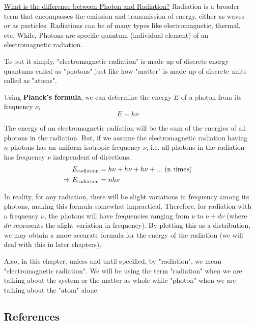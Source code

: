 \documentclass[12pt]{article}
\begin{document}
\uline{What is the difference between Photon and Radiation?} Radiation is a broader term that encompasses the emission and transmission of energy, either as waves or as particles. Radiations can be of many types like electromagnetic, thermal, etc. While, Photons are specific quantum (individual element) of an electromagnetic radiation. \vspace{.2cm}

To put it simply, "electromagnetic radiation" is made up of discrete energy quantums called as "photons" just like how "matter" is made up of discrete units called as "atoms". \vspace{.2cm}

Using \textbf{Planck's formula}, we can determine the energy \(E\) of a photon from its frequency \(\nu\), \vspace{.2cm}
\begin{equation}
    E = h\nu
\end{equation} \vspace{.2cm}

The energy of an electromagnetic radiation will be the sum of the energies of all photons in the radiation. But, if we assume the electromagnetic radiation having $n$ photons has an uniform isotropic frequency $\nu$, i.e. all photons in the radiation has frequency $\nu$ independent of directions,
\begin{align}
    E_{\text{radiation}} &= h\nu + h\nu + h\nu + ... \text{ (n times)} \notag \\
    \Rightarrow E_{\text{radiation}} &= nh\nu
\end{align}

In reality, for any radiation, there will be slight variations in frequency among its photons, making this formula somewhat impractical. Therefore, for radiation with a frequency \(\nu\), the photons will have frequencies ranging from \(\nu\) to \(\nu + d\nu\) (where \(d\nu\) represents the slight variation in frequency). By plotting this as a distribution, we may obtain a more accurate formula for the energy of the radiation (we will deal with this in later chapters). \vspace{.2cm}

Also, in this chapter, unless and until specified, by "radiation", we mean "electromagnetic radiation". We will be using the term "radiation" when we are talking about the system or the matter as whole while "photon" when we are talking about the "atom" alone.

\subsection{References}
\end{document}
